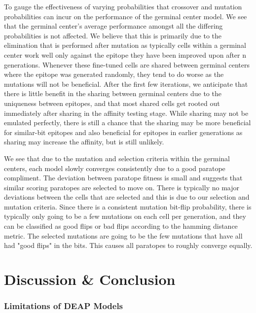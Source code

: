 \documentclass[conference]{IEEEtran}
\begin{document}
To gauge the effectiveness of varying probabilities that crossover and mutation probabilities can incur on the performance of the germinal center model. We see that the germinal center's average performance amongst all the differing probabilities is not affected. We believe that this is primarily due to the elimination that is performed after mutation as typically cells within a germinal center work well only against the epitope they have been improved upon after n generations. Whenever these fine-tuned cells are shared between germinal centers where the epitope was generated randomly, they tend to do worse as the mutations will not be beneficial. After the first few iterations, we anticipate that there is little benefit in the sharing between germinal centers due to the uniqueness between epitopes, and that most shared cells get rooted out immediately after sharing in the affinity testing stage. While sharing may not be emulated perfectly, there is still a chance that the sharing may be more beneficial for similar-bit epitopes and also beneficial for epitopes in earlier generations as sharing may increase the affinity, but is still unlikely.

We see that due to the mutation and selection criteria within the germinal centers, each model slowly converges consistently due to a good paratope compliment. The deviation between paratope fitness is small and suggests that similar scoring paratopes are selected to move on. There is typically no major deviations between the cells that are selected and this is due to our selection and mutation criteria. Since there is a consistent mutation bit-flip probability, there is typically only going to be a few mutations on each cell per generation, and they can be classified as good flips or bad flips according to the hamming distance metric. The selected mutations are going to be the few mutations that have all had "good flips" in the bits. This causes all paratopes to roughly converge equally. 



\section{Discussion \& Conclusion}

\subsubsection{Limitations of DEAP Models}
\end{document}
